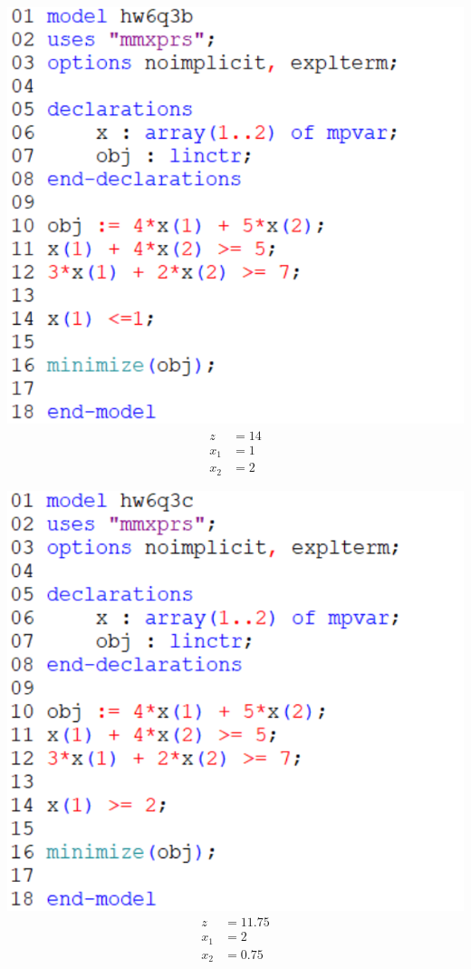 \documentclass[12pt]{article}
\theoremstyle{definition}
\begin{document}
\begin{center}
    \begin{minipage}{0.4\textwidth}
        \includegraphics[width=\textwidth]{code3b.png}
        \begin{align*}
            z &= 14 \\
            x_1 &= 1 \\
            x_2 &= 2
        \end{align*}
    \end{minipage}
    \begin{minipage}{0.4\textwidth}
        \includegraphics[width=\textwidth]{code3c.png}
        \begin{align*}
            z &= 11.75 \\
            x_1 &= 2 \\
            x_2 &= 0.75
        \end{align*}
    \end{minipage}
\end{center}
\end{document}
